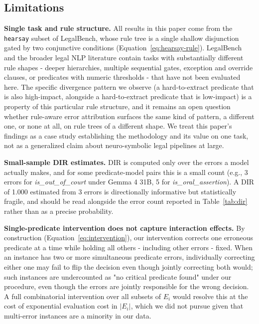 \subsection{Limitations}
\label{subsec:limitations}
\textbf{Single task and rule structure.} All results in this paper come from the \texttt{hearsay} subset of LegalBench, whose rule tree is a single shallow disjunction gated by two conjunctive conditions (Equation~\ref{eq:hearsay-rule}). LegalBench and the broader legal NLP literature contain tasks with substantially different rule shapes - deeper hierarchies\cite{lan2026hscodecomp}, multiple sequential gates\cite{fan2026lexam}, exception and override clauses\cite{cooper2026defab}, or predicates with numeric thresholds\cite{sadowski2025verifiable} - that have not been evaluated here. The specific divergence pattern we observe (a hard-to-extract predicate that is also high-impact, alongside a hard-to-extract predicate that is low-impact) is a property of this particular rule structure, and it remains an open question whether rule-aware error attribution surfaces the same kind of pattern, a different one, or none at all, on rule trees of a different shape. We treat this paper's findings as a case study establishing the methodology and its value on one task, not as a generalized claim about neuro-symbolic legal pipelines at large.

\textbf{Small-sample DIR estimates.} DIR is computed only over the errors a model actually makes, and for some predicate-model pairs this is a small count (e.g., 3 errors for \textit{is\_out\_of\_court} under Gemma 4 31B, 5 for \textit{is\_oral\_assertion}). A DIR of 1.000 estimated from 3 errors is directionally informative but statistically fragile, and should be read alongside the error count reported in Table~\ref{tab:dir} rather than as a precise probability.

\textbf{Single-predicate intervention does not capture interaction effects.} By construction (Equation~\ref{eq:intervention}), our intervention corrects one erroneous predicate at a time while holding all others - including other errors - fixed. When an instance has two or more simultaneous predicate errors, individually correcting either one may fail to flip the decision even though jointly correcting both would; such instances are undercounted as "no critical predicate found" under our procedure, even though the errors are jointly responsible for the wrong decision. A full combinatorial intervention over all subsets of $E_i$ would resolve this at the cost of exponential evaluation cost in $|E_i|$, which we did not pursue given that multi-error instances are a minority in our data.

